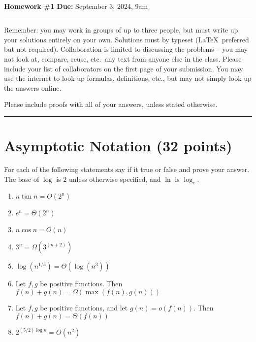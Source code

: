 

\\
{{\bf Homework \#1}} \hfill {{\bf Due:} September 3, 2024, 9am} \\
\rule[0.1in]{\textwidth}{0.4pt}

Remember: you may work in groups of up to three people, but must write up your solutions entirely on your own. Solutions must by typeset (\LaTeX\ preferred but not required). Collaboration is limited to discussing the problems -- you may not look at, compare, reuse, etc.~any text from anyone else in the class. Please include your list of collaborators on the first page of your submission. You may use the internet to look up formulas, definitions, etc., but may not simply look up the answers online. 

Please include proofs with all of your answers, unless stated otherwise.

\noindent \rule[0.1in]{\textwidth}{0.4pt}

\section{Asymptotic Notation (32 points)}

For each of the following statements say if it true or false and prove your answer. The base of $\log$ is $2$ unless otherwise specified, and $\ln$ is $\log_e$.

\begin{enumerate}
\item $n \tan n = O(2^n)$

\item $e^n = \Theta(2^{n})$

\item $n \cos n = O(n)$

\item $3^n = \Omega(3^{(n+2)})$

\item $\log(n^{1/5}) = \Theta(\log (n^{3}))$

\item Let $f,g$ be positive functions. Then $f(n)+g(n) = \Omega(\max(f(n),g(n)))$

\item Let $f,g$ be positive functions, and let $g(n) = o(f(n))$. Then $f(n)+g(n) = \Theta(f(n))$

\item $2^{(5/2) \log n} = O(n^2)$

\end{enumerate}


